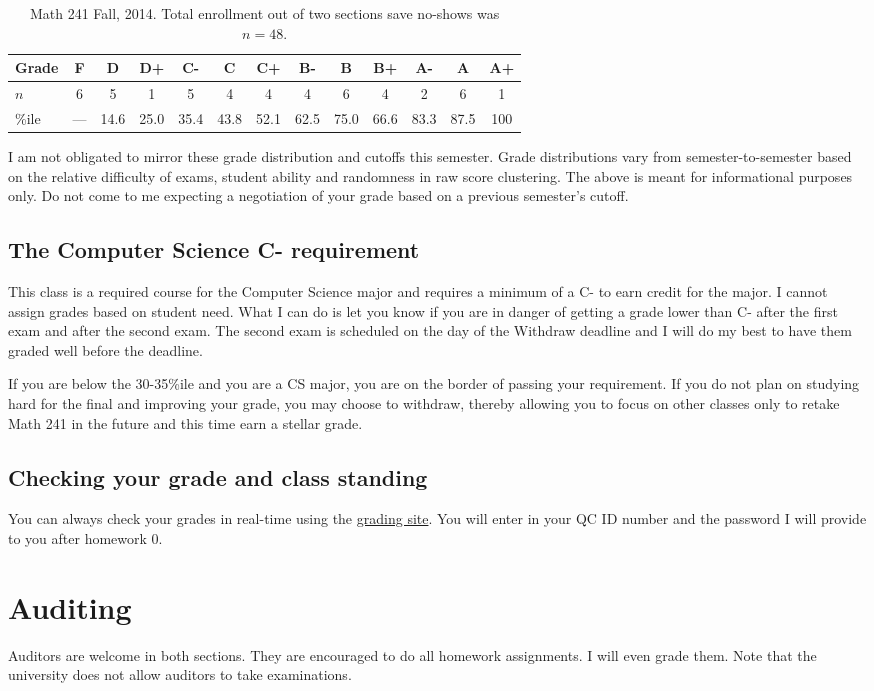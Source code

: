 \documentclass[12pt]{article}
\begin{document}
\begin{table}[h]
\centering
\begin{tabular}{l|cccccccccccc}
Grade & F & D & D+ & C- & C & C+ & B- & B & B+ & A- & A & A+ \\ \hline
$n$ & 6 & 5 & 1 & 5 & 4 & 4 & 4 & 6 & 4 & 2 & 6 & 1 \\
\%ile & --- & 14.6 &  25.0 & 35.4 & 43.8 & 52.1 & 62.5 & 75.0 & 66.6 &  83.3 & 87.5 & 100 \\ \hline
\end{tabular}
\caption{Math 241 Fall, 2014. Total enrollment out of two sections save no-shows was $n=48$.}
\end{table}

I am not obligated to mirror these grade distribution and cutoffs this semester. Grade distributions vary from semester-to-semester based on the relative difficulty of exams, student ability and randomness in raw score clustering. The above is meant for informational purposes only. Do not come to me expecting a negotiation of your grade based on a previous semester's cutoff.

\subsection*{The Computer Science C- requirement}

This class is a required course for the Computer Science major and requires a minimum of a C- to earn credit for the major. I cannot assign grades based on student need. What I can do is let you know if you are in danger of getting a grade lower than C- after the first exam and after the second exam. The second exam is scheduled on the day of the Withdraw deadline and I will do my best to have them graded well before the deadline. 

If you are below the 30-35\%ile and you are a CS major, you are on the border of passing your requirement. If you do not plan on studying hard for the final and improving your grade, you may choose to withdraw, thereby allowing you to focus on other classes only to retake Math 241 in the future and this time earn a stellar grade.

\subsection*{Checking your grade and class standing}

You can always check your grades in real-time using the \href{http://gradesly.com}{grading site}. You will enter in your QC ID number and the password I will provide to you after homework 0.



\section*{Auditing}

Auditors are welcome in both sections. They are encouraged to do all homework assignments. I will even grade them. Note that the university does not allow auditors to take examinations.
\end{document}
